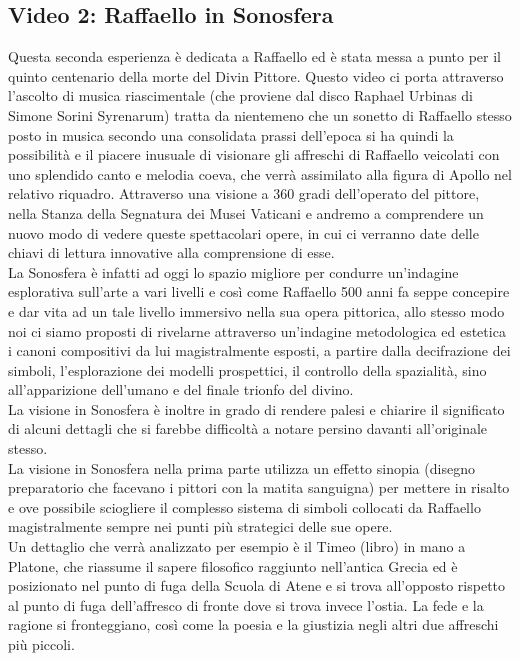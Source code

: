 \documentclass[hidelinks,12pt,a4paper]{article}
\begin{document}
\begin{flushleft}
		\subsection{Video 2: Raffaello in Sonosfera}
		Questa seconda esperienza è dedicata a Raffaello ed è stata messa a punto per il quinto centenario della morte del Divin Pittore. Questo video ci porta attraverso l'ascolto di musica riascimentale (che proviene dal disco Raphael Urbinas di Simone Sorini Syrenarum) tratta da nientemeno che un sonetto di Raffaello stesso posto in musica secondo una consolidata prassi dell'epoca si ha quindi la possibilità e il piacere inusuale di  visionare gli affreschi di Raffaello veicolati con uno splendido canto e melodia coeva, che verrà assimilato alla figura di Apollo nel relativo riquadro.  Attraverso una visione a 360 gradi dell'operato del pittore, nella Stanza della Segnatura dei Musei Vaticani e andremo a comprendere un nuovo modo di vedere queste spettacolari opere, in cui ci verranno date delle chiavi di lettura innovative alla comprensione di esse.\\
		La Sonosfera è infatti ad oggi lo spazio migliore per condurre un'indagine esplorativa sull'arte a vari livelli e così come Raffaello 500 anni fa seppe concepire e dar vita ad un tale livello immersivo nella sua opera pittorica, allo stesso modo noi ci siamo proposti di rivelarne attraverso un'indagine metodologica ed estetica i canoni compositivi da lui magistralmente esposti, a partire dalla decifrazione dei simboli, l'esplorazione dei modelli prospettici, il controllo della spazialità, sino all'apparizione dell'umano e del finale trionfo del divino.\\
		La visione in Sonosfera è inoltre in grado di rendere palesi e chiarire il significato di alcuni dettagli che si farebbe difficoltà a notare persino davanti all'originale stesso.\\
		La visione in Sonosfera  nella prima parte utilizza un effetto sinopia (disegno preparatorio che facevano i pittori con la matita sanguigna) per mettere in risalto e ove possibile sciogliere il complesso sistema di simboli collocati da Raffaello magistralmente sempre nei punti più strategici delle sue opere.\\
		Un dettaglio che verrà analizzato per esempio è il Timeo (libro) in mano a Platone, che riassume il sapere filosofico raggiunto nell'antica Grecia ed è posizionato nel punto di fuga della Scuola di Atene e si trova all'opposto rispetto al punto di fuga dell'affresco di fronte dove si trova invece l'ostia. La fede e la ragione si fronteggiano, così come la poesia e la giustizia negli altri due affreschi più piccoli.\\

\end{flushleft}
\end{document}
